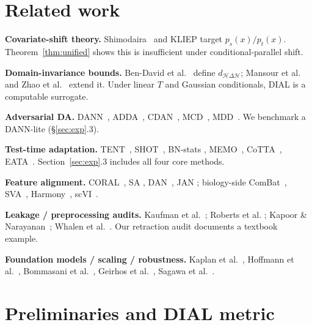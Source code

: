 \documentclass{article}
\begin{document}
\section{Related work}
\label{sec:related}

\textbf{Covariate-shift theory.}
Shimodaira~\citep{shimodaira2000improving} and KLIEP
\citep{sugiyama2007kliep} target $p_s(x)/p_t(x)$.
Theorem~\ref{thm:unified} shows this is insufficient under
conditional-parallel shift.

\textbf{Domain-invariance bounds.}
Ben-David et al.~\citep{ben2007theory,ben2010theory} define
$d_{\mathcal{H}\Delta\mathcal{H}}$;
Mansour et al.~\citep{mansour2009domain} and Zhao
et al.~\citep{zhao2019learning} extend it. Under linear $T$ and
Gaussian conditionals, DIAL is a computable surrogate.

\textbf{Adversarial DA.}
DANN~\citep{ganin2015dann,ganin2016dann}, ADDA~\citep{tzeng2017adda},
CDAN~\citep{long2018cdan}, MCD~\citep{saito2018mcd},
MDD~\citep{zhang2019mdd}. We benchmark a DANN-lite
(\S\ref{sec:exp}.3).

\textbf{Test-time adaptation.}
TENT~\citep{wang2021tent}, SHOT~\citep{liang2020shot}, BN-stats
\citep{schneider2020bn}, MEMO~\citep{zhang2022memo},
CoTTA~\citep{wang2022cotta}, EATA~\citep{niu2022eata}.
Section~\ref{sec:exp}.3 includes all four core methods.

\textbf{Feature alignment.} CORAL~\citep{sun2016coral}, SA
\citep{fernando2013sa}, DAN~\citep{long2015dan}, JAN
\citep{long2017jan}; biology-side ComBat~\citep{johnson2007combat},
SVA~\citep{leek2010sva}, Harmony~\citep{korsunsky2019harmony},
scVI~\citep{lopez2018scvi}.

\textbf{Leakage / preprocessing audits.}
Kaufman et al.~\citep{kaufman2012leakage}; Roberts et al.
\citep{roberts2017cross}; Kapoor \& Narayanan~\citep{kapoor2022leakage};
Whalen et al.~\citep{whalen2022leakage}. Our retraction audit
documents a textbook example.

\textbf{Foundation models / scaling / robustness.}
Kaplan et al.~\citep{kaplan2020scaling},
Hoffmann et al.~\citep{hoffmann2022chinchilla},
Bommasani et al.~\citep{bommasani2021foundation},
Geirhos et al.~\citep{geirhos2020shortcut},
Sagawa et al.~\citep{sagawa2020group}.

\section{Preliminaries and DIAL metric}
\label{sec:prelim}
\end{document}
